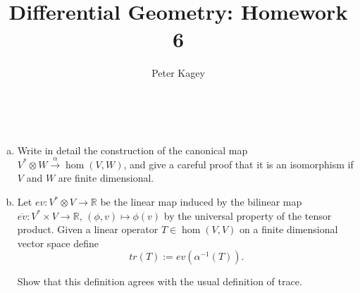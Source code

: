 \documentclass{article}
\newenvironment{problem}[2][Problem]{\begin{trivlist}
\item[\hskip \labelsep {\bfseries #1}\hskip \labelsep {\bfseries #2.}]}{\end{trivlist}}
\begin{document}
\title{Differential Geometry: Homework 6}
\author{Peter Kagey}

\maketitle

\begin{problem}{1} \text{} \\
  \begin{enumerate}[(a)]
    \item  Write in detail the construction of the canonical map
      $V^* \otimes W \xrightarrow{\alpha} \hom(V, W)$,
      and give a careful proof that it is an isomorphism if $V$ and $W$ are
      finite dimensional.
    \item Let $ev\colon V^* \otimes V \rightarrow \mathbb{R}$ be the linear map
    induced by the bilinear map
    $\overline{ev}\colon V^* \times V \rightarrow \mathbb{R}$,
    $(\phi, v) \mapsto \phi(v)$ by the universal property of the tensor product.
    Given a linear operator $T \in \hom(V, V)$ on a finite dimensional vector
    space define \[
      tr(T) := ev(\alpha^{-1}(T)).
    \]

    Show that this definition agrees with the usual definition of trace.
  \end{enumerate}
\end{problem}
\end{document}
